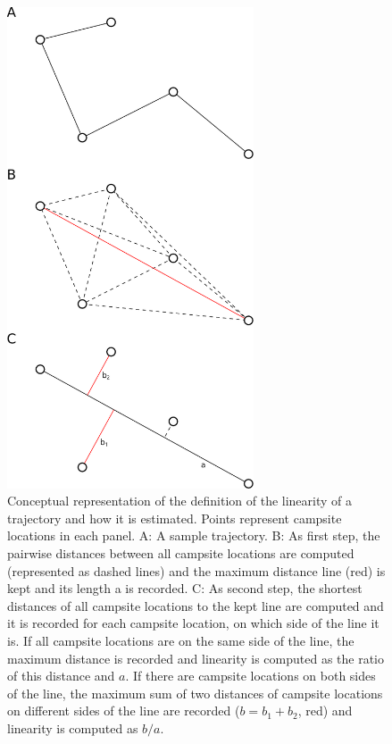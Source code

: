 \documentclass[]{elsarticle} %
\begin{document}
\begin{figure}[H]

{\centering \includegraphics[width=0.65\textwidth]{./../figures/si_definition_linearity_tot} 

}

\caption{Conceptual representation of the definition of the linearity of a trajectory and how it is estimated. Points represent campsite locations in each panel. A: A sample trajectory. B: As first step, the pairwise distances between all campsite locations are computed (represented as dashed lines) and the maximum distance line (red) is kept and its length a is recorded. C: As second step, the shortest distances of all campsite locations to the kept line are computed and it is recorded for each campsite location, on which side of the line it is. If all campsite locations are on the same side of the line, the maximum distance is recorded and linearity is computed as the ratio of this distance and $a$. If there are campsite locations on both sides of the line, the maximum sum of two distances of campsite locations on different sides of the line are recorded ($b = b_1 + b_2$, red) and linearity is computed as $b/a$.}\label{fig:appendix-definition-linearity}
\end{figure}
\end{document}
